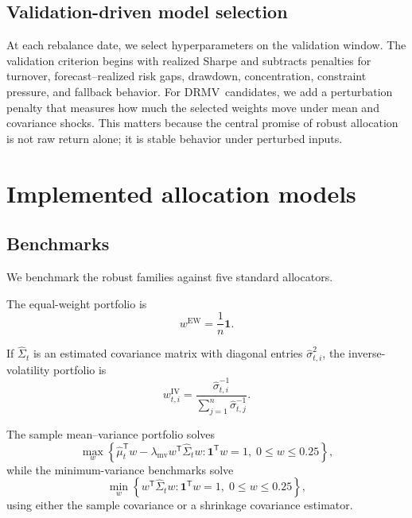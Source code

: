 \documentclass[11pt]{article}
\newcommand{\ones}{\mathbf{1}}
\newcommand{\transpose}{\mathsf{T}}
\newcommand{\DRMV}{\ensuremath{\mathrm{DRMV}}}
\begin{document}
\subsection{Validation-driven model selection}

At each rebalance date, we select hyperparameters on the validation window. The validation criterion begins with realized Sharpe and subtracts penalties for turnover, forecast--realized risk gaps, drawdown, concentration, constraint pressure, and fallback behavior. For \DRMV\ candidates, we add a perturbation penalty that measures how much the selected weights move under mean and covariance shocks. This matters because the central promise of robust allocation is not raw return alone; it is stable behavior under perturbed inputs.

\section{Implemented allocation models}

\subsection{Benchmarks}

We benchmark the robust families against five standard allocators.

The equal-weight portfolio is
\begin{equation}
w^{\mathrm{EW}}= \frac{1}{n}\ones.
\end{equation}

If $\widehat\Sigma_t$ is an estimated covariance matrix with diagonal entries $\widehat\sigma_{t,i}^2$, the inverse-volatility portfolio is
\begin{equation}
w^{\mathrm{IV}}_{t,i}= \frac{\widehat\sigma_{t,i}^{-1}}{\sum_{j=1}^n \widehat\sigma_{t,j}^{-1}}.
\end{equation}

The sample mean--variance portfolio solves
\begin{equation}
\max_w\left\{\widehat\mu_t^\transpose w - \lambda_{\mathrm{mv}}w^\transpose\widehat\Sigma_t w:
\ones^\transpose w=1,\; 0\le w\le 0.25\right\},
\end{equation}
while the minimum-variance benchmarks solve
\begin{equation}
\min_w\left\{w^\transpose\widehat\Sigma_t w:
\ones^\transpose w=1,\; 0\le w\le 0.25\right\},
\end{equation}
using either the sample covariance or a shrinkage covariance estimator.
\end{document}
